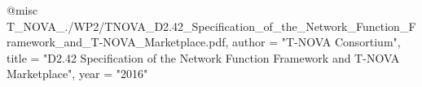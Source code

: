 @misc{ T_NOVA_./WP2/TNOVA_D2.42_Specification_of_the_Network_Function_Framework_and_T-NOVA_Marketplace.pdf,
       author = "{T-NOVA Consortium}",
       title = "D2.42 Specification of the Network Function Framework and T-NOVA Marketplace",
       year = "2016" }
